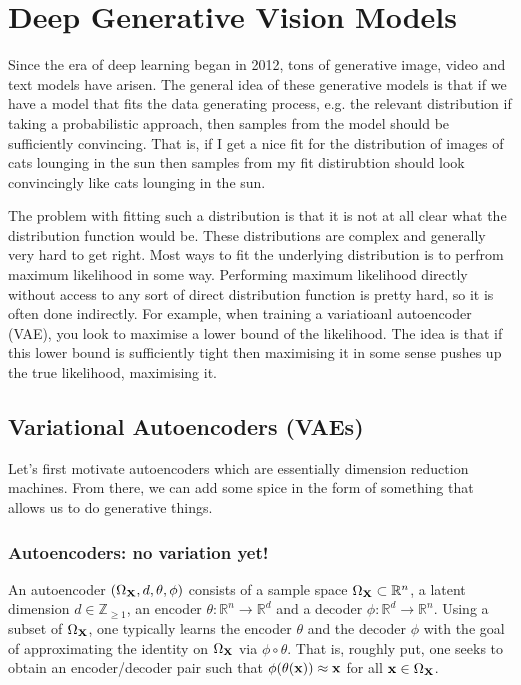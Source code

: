 \documentclass[11pt]{article}
\begin{document}
\section{Deep Generative Vision Models}

 Since the era of deep learning began in 2012, tons of generative image, video and text models have arisen. The general idea of these generative models is that if we have a model that fits the data generating process, e.g. the relevant distribution if taking a probabilistic approach, then samples from the model should be sufficiently convincing. That is, if I get a nice fit for the distribution of images of cats lounging in the sun then samples from my fit distirubtion should look convincingly like cats lounging in the sun.

The problem with fitting such a distribution is that it is not at all clear what the distribution function would be. These distributions are complex and generally very hard to get right. Most ways to fit the underlying distribution is to perfrom maximum likelihood in some way. Performing maximum likelihood directly without access to any sort of direct distribution function is pretty hard, so it is often done indirectly. For example, when training a variatioanl autoencoder (VAE), you look to maximise a lower bound of the likelihood. The idea is that if this lower bound is sufficiently tight then maximising it in some sense pushes up the true likelihood, maximising it.

\subsection{Variational Autoencoders (VAEs)}
 Let's first motivate autoencoders which are essentially dimension reduction machines. From there, we can add some spice in the form of something that allows us to do generative things.

\subsubsection{Autoencoders: no variation yet!}
\label{sec:autoencoders}
An autoencoder $(\Omega_{\mathbf{X}},d,\theta,\phi)$ consists of a sample space $\Omega_{\mathbf{X}}\subset\mathbb{R}^n$, a latent dimension $d\in\mathbb{Z}_{\geq1}$, an encoder $\theta:\mathbb{R}^n\to\mathbb{R}^d$ and a decoder $\phi:\mathbb{R}^d\to\mathbb{R}^n$. Using a subset of $\Omega_{\mathbf{X}}$, one typically learns the encoder $\theta$ and the decoder $\phi$ with the goal of approximating the identity on $\Omega_{\mathbf{X}}$ via $\phi\circ \theta$. That is, roughly put, one seeks to obtain an encoder/decoder pair such that $\phi(\theta(\mathbf{x}))\approx\mathbf{x}$ for all $\mathbf{x}\in\Omega_{\mathbf{X}}$.
\end{document}
